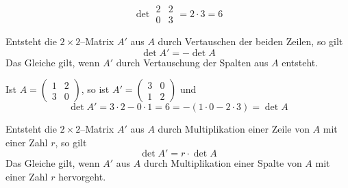 \begin{beispiel}
	$$ \det{ \begin{matrix} 2 & 2 \\ 0 & 3 \end{matrix} } = 2 \cdot 3 = 6 $$
\end{beispiel}

\begin{regel}\label{det_rule_2_3} Entsteht die $2 \times 2$--Matrix $A'$ aus $A$ durch Vertauschen der 
beiden Zeilen, so gilt
  	$$ \det{A'} = - \det{A} $$
Das Gleiche gilt, wenn $A'$ durch Vertauschung der Spalten aus $A$ entsteht.
\end{regel}


\begin{beispiel} Ist $A = \left( \begin{smallmatrix} 1 & 2 \\ 3 & 0 \end{smallmatrix} \right)$, so ist
$A' = \left( \begin{smallmatrix} 3 & 0 \\ 1 & 2 \end{smallmatrix} \right)$ und 
  $$ \det{A'} = 3 \cdot 2 - 0 \cdot 1 = 6 = - \left( 1 \cdot 0 - 2 \cdot 3 \right) = \det{A} $$
\end{beispiel}

\medbreak

\begin{regel}\label{det_rule_2_4} Entsteht die $2 \times 2$--Matrix $A'$ aus $A$ durch Multiplikation 
einer Zeile von $A$ mit 
einer Zahl $r$, so gilt
  	$$ \det{A'} = r \cdot \det{A} $$
Das Gleiche gilt, wenn $A'$ aus $A$ durch Multiplikation einer Spalte von $A$ mit 
einer Zahl $r$ hervorgeht.
\end{regel}



